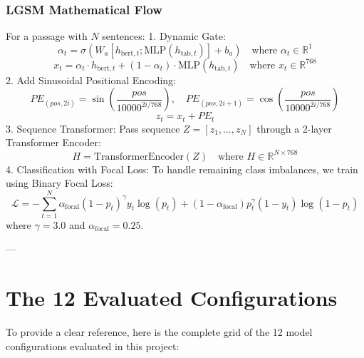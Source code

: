 \documentclass[11pt,a4paper]{article}
\begin{document}
\subsubsection{LGSM Mathematical Flow}
For a passage with $N$ sentences:
1. Dynamic Gate:
\[
\alpha_t = \sigma(W_a [h_{\text{bert}, t}; \text{MLP}(h_{\text{tab}, t})] + b_a) \quad \text{where } \alpha_t \in \mathbb{R}^1
\]
\[
x_t = \alpha_t \cdot h_{\text{bert}, t} + (1 - \alpha_t) \cdot \text{MLP}(h_{\text{tab}, t}) \quad \text{where } x_t \in \mathbb{R}^{768}
\]
2. Add Sinusoidal Positional Encoding:
\[
PE_{(pos, 2i)} = \sin\left(\frac{pos}{10000^{2i/768}}\right), \quad PE_{(pos, 2i+1)} = \cos\left(\frac{pos}{10000^{2i/768}}\right)
\]
\[
z_t = x_t + PE_t
\]
3. Sequence Transformer:
Pass sequence $Z = [z_1, \dots, z_N]$ through a 2-layer Transformer Encoder:
\[
H = \text{TransformerEncoder}(Z) \quad \text{where } H \in \mathbb{R}^{N \times 768}
\]
4. Classification with Focal Loss:
To handle remaining class imbalances, we train using Binary Focal Loss:
\[
\mathcal{L} = -\sum_{t=1}^N \alpha_{\text{focal}} (1 - p_t)^\gamma y_t \log(p_t) + (1 - \alpha_{\text{focal}}) p_t^\gamma (1 - y_t) \log(1 - p_t)
\]
where $\gamma = 3.0$ and $\alpha_{\text{focal}} = 0.25$.

---

\section{The 12 Evaluated Configurations}

To provide a clear reference, here is the complete grid of the 12 model configurations evaluated in this project:
\end{document}
